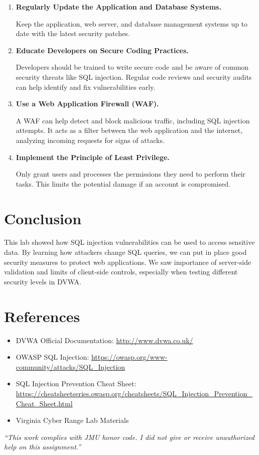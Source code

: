 \documentclass[12pt]{article}
\begin{document}
\begin{enumerate}
\item \textbf{Regularly Update the Application and Database Systems.}

Keep the application, web server, and database management systems up to date with the latest security patches. 

\item \textbf{Educate Developers on Secure Coding Practices.}

Developers should be trained to write secure code and be aware of common security threats like SQL injection. Regular code reviews and security audits can help identify and fix vulnerabilities early.

\item \textbf{Use a Web Application Firewall (WAF).}

A WAF can help detect and block malicious traffic, including SQL injection attempts. It acts as a filter between the web application and the internet, analyzing incoming requests for signs of attacks.

\item \textbf{Implement the Principle of Least Privilege.}

Only grant users and processes the permissions they need to perform their tasks. This limits the potential damage if an account is compromised.

\end{enumerate}

\section{Conclusion}

This lab showed how SQL injection vulnerabilities can be used to access sensitive data. By learning how attackers change SQL queries, we can put in place good security measures to protect web applications. We saw importance of server-side validation and limits of client-side controls, especially when testing different security levels in DVWA.

\section{References}

\begin{itemize}
    \item DVWA Official Documentation: \url{http://www.dvwa.co.uk/}
    \item OWASP SQL Injection: \url{https://owasp.org/www-community/attacks/SQL_Injection}
    \item SQL Injection Prevention Cheat Sheet: \url{https://cheatsheetseries.owasp.org/cheatsheets/SQL_Injection_Prevention_Cheat_Sheet.html}
    \item Virginia Cyber Range Lab Materials
\end{itemize}

\vfill
{\color{red}\textit{“This work complies with JMU honor code. I did not give or receive unauthorized help on this assignment.”}}
\end{document}
